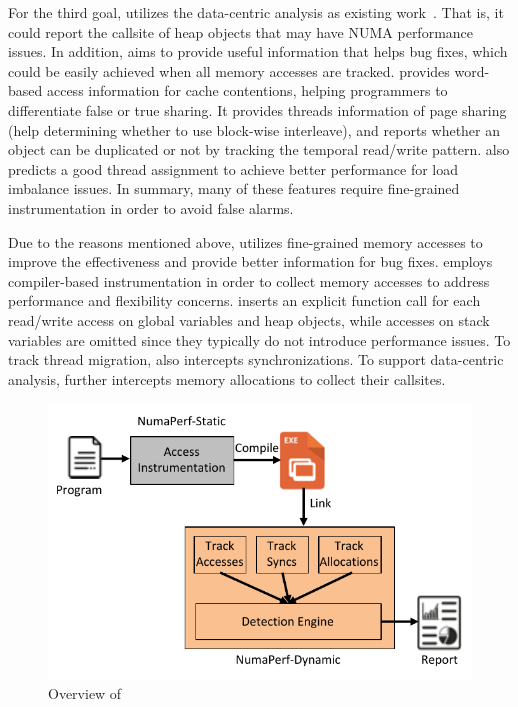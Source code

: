 For the third goal, \NP{} utilizes the data-centric analysis as existing work~\cite{XuNuma}. That is, it could report the callsite of heap objects that may have NUMA performance issues. 
In addition, \NP{} aims to provide useful information that helps bug fixes, which could be easily achieved when all memory accesses are tracked. \NP{} provides word-based access information for cache contentions, helping programmers to differentiate false or true sharing. It provides threads information of page sharing (help determining whether to use block-wise interleave), and reports whether an object can be duplicated or not by tracking the temporal read/write pattern.
\NP{} also predicts a good thread assignment to achieve better performance for load imbalance issues. In summary, many of these features require fine-grained instrumentation in order to avoid false alarms. 


Due to the reasons mentioned above, \NP{} utilizes fine-grained memory accesses to improve the effectiveness and provide better information for bug fixes. \NP{} employs compiler-based instrumentation in order to collect memory accesses to address performance and flexibility concerns. 
\NP{} inserts an explicit function call for each read/write access on global variables and heap objects, while accesses on stack variables are omitted since they typically do not introduce performance issues. To track thread migration, \NP{} also intercepts synchronizations. To support data-centric analysis, \NP{} further intercepts memory allocations to collect their callsites.  
\begin{figure}[!htbp]
\centering
\includegraphics[width=0.98\columnwidth]{figures/overview.pdf}
\caption{Overview of \NP{}\label{fig:overview}}
\vspace{-0.2in}
\end{figure}


